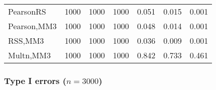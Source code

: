\documentclass[
]{article}
\begin{document}
\begin{table}[H]
{\begin{tabular}[t]{lrrrrrr}
\hspace{1em}PearsonRS & 1000 & 1000 & 1000 & 0.051 & 0.015 & 0.001\\
\hspace{1em}Pearson,MM3 & 1000 & 1000 & 1000 & 0.048 & 0.014 & 0.001\\
\hspace{1em}RSS,MM3 & 1000 & 1000 & 1000 & 0.036 & 0.009 & 0.001\\
\hspace{1em}Multn,MM3 & 1000 & 1000 & 1000 & 0.842 & 0.733 & 0.461\\
\bottomrule
\end{tabular}}
\end{table}

\hypertarget{type-i-errors-n3000-3}{%
\subsubsection{\texorpdfstring{Type I errors
(\(n=3000\))}{Type I errors (n=3000)}}\label{type-i-errors-n3000-3}}
\end{document}
